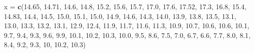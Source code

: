 \documentclass[]{article}
\newenvironment{Shaded}{\begin{snugshade}}{\end{snugshade}}
\newcommand{\KeywordTok}[1]{\textcolor[rgb]{0.13,0.29,0.53}{\textbf{#1}}}
\newcommand{\DecValTok}[1]{\textcolor[rgb]{0.00,0.00,0.81}{#1}}
\newcommand{\FloatTok}[1]{\textcolor[rgb]{0.00,0.00,0.81}{#1}}
\newcommand{\StringTok}[1]{\textcolor[rgb]{0.31,0.60,0.02}{#1}}
\newcommand{\NormalTok}[1]{#1}
\begin{document}
\begin{Shaded}
\begin{Highlighting}[]
\NormalTok{x =}\StringTok{ }\KeywordTok{c}\NormalTok{(}\FloatTok{14.65}\NormalTok{, }\FloatTok{14.71}\NormalTok{, }\FloatTok{14.6}\NormalTok{, }\FloatTok{14.8}\NormalTok{, }\FloatTok{15.2}\NormalTok{, }\FloatTok{15.6}\NormalTok{, }\FloatTok{15.7}\NormalTok{, }\FloatTok{17.0}\NormalTok{, }\FloatTok{17.6}\NormalTok{, }\FloatTok{17.52}\NormalTok{, }\FloatTok{17.3}\NormalTok{, }
  \FloatTok{16.8}\NormalTok{, }\FloatTok{15.4}\NormalTok{, }\FloatTok{14.83}\NormalTok{, }\FloatTok{14.4}\NormalTok{, }\FloatTok{14.5}\NormalTok{, }
  \FloatTok{15.0}\NormalTok{, }\FloatTok{15.1}\NormalTok{, }\FloatTok{15.0}\NormalTok{, }\FloatTok{14.9}\NormalTok{, }\FloatTok{14.6}\NormalTok{, }\FloatTok{14.3}\NormalTok{, }\FloatTok{14.0}\NormalTok{, }\FloatTok{13.9}\NormalTok{, }\FloatTok{13.8}\NormalTok{, }\FloatTok{13.5}\NormalTok{, }\FloatTok{13.1}\NormalTok{, }\FloatTok{13.0}\NormalTok{, }
  \FloatTok{13.3}\NormalTok{, }\FloatTok{13.2}\NormalTok{, }\FloatTok{13.1}\NormalTok{, }\FloatTok{12.9}\NormalTok{, }\FloatTok{12.4}\NormalTok{, }\FloatTok{11.9}\NormalTok{, }\FloatTok{11.7}\NormalTok{, }\FloatTok{11.6}\NormalTok{, }\FloatTok{11.3}\NormalTok{, }\FloatTok{10.9}\NormalTok{, }
  \FloatTok{10.7}\NormalTok{, }\FloatTok{10.6}\NormalTok{, }\FloatTok{10.6}\NormalTok{, }\FloatTok{10.1}\NormalTok{, }\FloatTok{9.7}\NormalTok{, }\FloatTok{9.4}\NormalTok{, }\FloatTok{9.3}\NormalTok{, }\FloatTok{9.6}\NormalTok{, }\FloatTok{9.9}\NormalTok{, }\FloatTok{10.1}\NormalTok{, }\FloatTok{10.2}\NormalTok{, }\FloatTok{10.3}\NormalTok{,  }\FloatTok{10.0}\NormalTok{, }\FloatTok{9.5}\NormalTok{, }
  \FloatTok{8.6}\NormalTok{, }\FloatTok{7.5}\NormalTok{, }\FloatTok{7.0}\NormalTok{, }\FloatTok{6.7}\NormalTok{, }\FloatTok{6.6}\NormalTok{, }\FloatTok{7.7}\NormalTok{, }
  \FloatTok{8.0}\NormalTok{, }\FloatTok{8.1}\NormalTok{, }\FloatTok{8.4}\NormalTok{, }\FloatTok{9.2}\NormalTok{, }\FloatTok{9.3}\NormalTok{, }\DecValTok{10}\NormalTok{, }\FloatTok{10.2}\NormalTok{, }\FloatTok{10.3}\NormalTok{)}


\end{Highlighting}
\end{Shaded}
\end{document}
